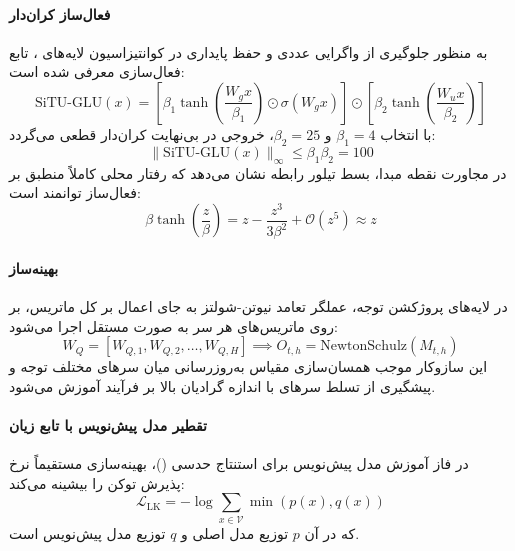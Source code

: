 \paragraph*{فعال‌ساز کران‌دار }
به منظور جلوگیری از واگرایی عددی و حفظ پایداری در کوانتیزاسیون لایه‌های ، تابع فعال‌سازی  معرفی شده است:
\begin{equation}
    \text{SiTU-GLU}(x) = \left[ \beta_1 \tanh\left(\frac{W_g x}{\beta_1}\right) \odot \sigma(W_g x) \right] \odot \left[ \beta_2 \tanh\left(\frac{W_u x}{\beta_2}\right) \right]
\end{equation}
با انتخاب $\beta_1 = 4$ و $\beta_2 = 25$، خروجی در بی‌نهایت کران‌دار قطعی می‌گردد:
\begin{equation}
    \|\text{SiTU-GLU}(x)\|_\infty \le \beta_1 \beta_2 = 100
\end{equation}
در مجاورت نقطه مبدا، بسط تیلور رابطه نشان می‌دهد که رفتار محلی کاملاً منطبق بر فعال‌ساز توانمند  است:
\begin{equation}
    \beta \tanh\left(\frac{z}{\beta}\right) = z - \frac{z^3}{3\beta^2} + \mathcal{O}(z^5) \approx z
\end{equation}

\paragraph*{بهینه‌ساز }
در لایه‌های پروژکشن توجه، عملگر تعامد نیوتن-شولتز به جای اعمال بر کل ماتریس، بر روی ماتریس‌های هر سر به صورت مستقل اجرا می‌شود:
\begin{equation}
    W_Q = [W_{Q,1}, W_{Q,2}, \dots, W_{Q,H}] \implies O_{t,h} = \text{NewtonSchulz}(M_{t,h})
\end{equation}
این سازوکار موجب همسان‌سازی مقیاس به‌روزرسانی میان سرهای مختلف توجه و پیشگیری از تسلط سرهای با اندازه گرادیان بالا بر فرآیند آموزش می‌شود.

\paragraph*{تقطیر مدل پیش‌نویس با تابع زیان }
در فاز آموزش مدل پیش‌نویس برای استنتاج حدسی ()، بهینه‌سازی مستقیماً نرخ پذیرش توکن را بیشینه می‌کند:
\begin{equation}
    \mathcal{L}_{\text{LK}} = -\log \sum_{x \in \mathcal{V}} \min(p(x), q(x))
\end{equation}
که در آن $p$ توزیع مدل اصلی و $q$ توزیع مدل پیش‌نویس است.

